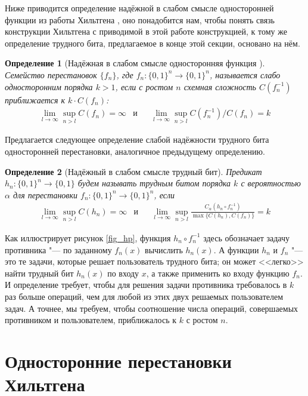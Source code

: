 \documentclass[oneside, a4paper]{article}
\theoremstyle{plain}
\newtheorem{definition}{Определение}
\theoremstyle{remark}
\begin{document}
Ниже приводится определение надёжной в слабом смысле односторонней функции
из работы Хильтгена \cite{hiltgen1993}, оно понадобится нам, чтобы понять
связь конструкции Хильтгена с приводимой в этой работе конструкцией, к тому же
определение трудного бита, предлагаемое в конце этой секции, основано на нём.

\begin{definition}[Надёжная в слабом смысле односторонняя функция \cite{hiltgen1993}]
Семейство перестановок $\{f_n\}$, где $f_n : \{0, 1\}^n \to \{0, 1\}^n$,
называется слабо односторонним порядка $k > 1$, если с ростом $n$ схемная
сложность $C(f_n^{-1})$ приближается к $k \cdot C(f_n)$:
\[
\begin{aligned}
&\lim_{l \to \infty} \sup_{n > l} C(f_n) = \infty
&
\text{и}&
&
\lim_{l \to \infty} \sup_{n > l} C(f_n^{-1}) / C(f_n) = k&
\end{aligned}
\]
\end{definition}

Предлагается следующее определение слабой надёжности трудного бита односторонней
перестановки, аналогичное предыдущему определению.

\begin{definition}[Надёжный в слабом смысле трудный бит]
Предикат $h_n : \{0, 1\}^n \to \{0, 1\}$ будем называть трудным битом порядка
$k$ с вероятностью $\alpha$ для перестановки $f_n : \{0, 1\}^n \to \{0, 1\}^n$,
если
\[
\begin{aligned}
&\lim_{l \to \infty} \sup_{n > l} C(h_n) = \infty
&
\text{и}&
&
\lim_{l \to \infty} \sup_{n > l} \frac {C_\alpha(h_n \circ f_n^{-1})} {\max \{ C(h_n), C(f_n) \}} = k&
\end{aligned}
\]
\end{definition}

Как иллюстрирует рисунок \ref{fig_hp}, функция $h_n \circ f_n^{-1}$ здесь
обозначает задачу противника "--- по заданному $f_n(x)$ вычислить $h_n(x)$. А
функции $h_n$ и $f_n$ "--- это те задачи, которые решает пользователь трудного
бита; он может <<легко>> найти трудный бит $h_n(x)$ по входу $x$, а также
применить ко входу функцию $f_n$. И определение требует, чтобы для решения
задачи противника требовалось в $k$ раз больше операций, чем для любой из этих
двух решаемых пользователем задач. А точнее, мы требуем, чтобы соотношение числа
операций, совершаемых противником и пользователем, приближалось к $k$ с ростом
$n$.

\section{Односторонние перестановки Хильтгена}
\label{sec_hiltgen}
\end{document}

